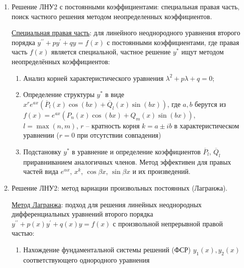 \documentclass[12pt]{article}
\begin{document}
\begin{enumerate}
\begin{enumerate}
            \item Комплексной паре $\lambda = \alpha \pm i\beta$ кратности $t$ соответствует набор 
            
            $\{e^{\alpha x} \cos \beta x, e^{\alpha x} \sin \beta x, x e^{\alpha x} \cos \beta x, \dots, x^{t - 1}e^{\alpha x} \cos\beta x, x^{t - 1}e^{\alpha x} \sin\beta x\}$
        \end{enumerate}

        $\overline{y} = l_{\{\text{ФСР}\}}$

        \item Решение ЛНУ2 с постоянными коэффициентами: специальная правая часть, поиск частного решения методом неопределенных коэффициентов.

        \hyperlink{specialrightpart}{Специальная правая часть}: для линейного неоднородного уравнения второго порядка $y^{\prime\prime} + py^\prime + qy = f(x)$ с постоянными коэффициентами, где правая часть $f(x)$ является специальной, частное решение $y^*$ ищут методом неопределённых коэффициентов: 
        
        \begin{enumerate}
            \item Анализ корней характеристического уравнения $\lambda^2 + p\lambda + q = 0$;
            \item Определение структуры $y^*$ в виде $x^r e^{ax} (\overline{P}_l(x) \cos(bx) + \overline{Q}_l(x) \sin(bx))$, где
            $a, b$ берутся из $f(x) = e^{ax}(P_n(x)\cos(bx) + Q_m(x)\sin(bx))$,
            $l = \max(n, m)$,
            $r$ -- кратность корня $k = a \pm ib$ в характеристическом уравнении ($r = 0$ при отсутствии совпадения)
            \item Подстановку $y^*$ в уравнение и определение коэффициентов $\overline{P}_l$, $\overline{Q}_l$ приравниванием аналогичных членов. Метод эффективен для правых частей вида $e^{\alpha x}$, $x^k$, $\cos \beta x$, $\sin \beta x$ и их произведений.
        \end{enumerate}


        \item Решение ЛНУ2: метод вариации произвольных постоянных (Лагранжа).

        \hyperlink{methodLagrangesecondorder}{Метод Лагранжа}: подход для решения линейных неоднородных дифференциальных уравнений второго порядка $y^{\prime\prime} + p(x)y^\prime + q(x)y = f(x)$ с произвольной непрерывной правой частью:
        \begin{enumerate} 
            \item Нахождение фундаментальной системы решений (ФСР) $y_1(x), y_2(x)$ соответствующего однородного уравнения


\end{enumerate}
\end{enumerate}
\end{document}
